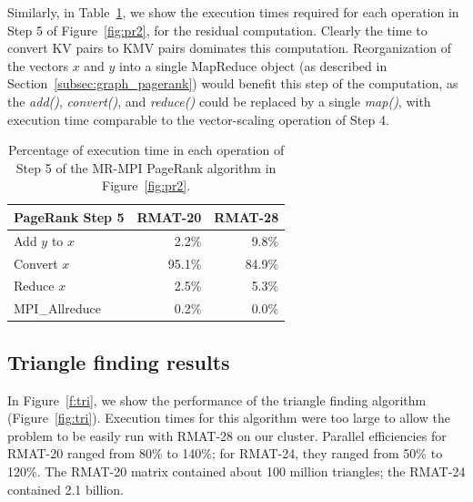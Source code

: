 Similarly, in Table~\ref{table:prdetail5}, we show the execution times
required for each operation in Step 5 of Figure~\ref{fig:pr2}, for the
residual computation.  Clearly the time to convert KV pairs to KMV
pairs dominates this computation.  Reorganization of the vectors $x$
and $y$ into a single MapReduce object (as described in
Section~\ref{subsec:graph_pagerank}) would benefit this step of the
computation, as the {\it add()}, {\it convert()}, and {\it reduce()}
could be replaced by a single {\it map()}, with execution time
comparable to the vector-scaling operation of Step 4.

\begin{table}[htb]
\begin{center}
\begin{tabular}{|l|r|r|}
\hline 
PageRank Step 5 & RMAT-20 & RMAT-28 \\
\hline
Add $y$ to $x$ &  2.2\% &  9.8\% \\
Convert $x$    & 95.1\% & 84.9\% \\
Reduce $x$     &  2.5\% &  5.3\% \\
MPI\_Allreduce &  0.2\% &  0.0\% \\
\hline
\end{tabular}
\caption{Percentage of execution time in each operation of Step 5 of
the MR-MPI PageRank algorithm in Figure~\ref{fig:pr2}.}
\label{table:prdetail5}
\end{center}
\end{table}

%

\subsection{Triangle finding results}

In Figure~\ref{f:tri}, we show the performance of the triangle finding
algorithm (Figure~\ref{fig:tri}).  Execution times for this algorithm
were too large to allow the problem to be easily run with RMAT-28 on
our cluster.  Parallel efficiencies for RMAT-20 ranged from 80\% to
140\%; for RMAT-24, they ranged from 50\% to 120\%.  The RMAT-20
matrix contained about 100 million triangles; the RMAT-24 contained
2.1 billion.

